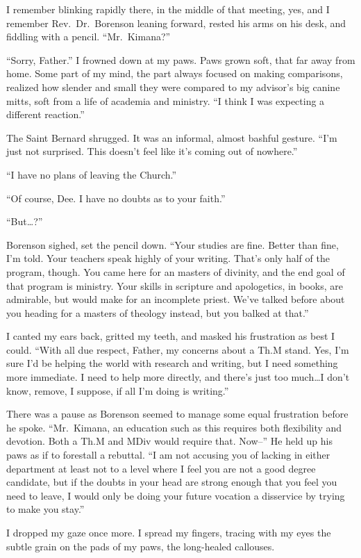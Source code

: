 I remember blinking rapidly there, in the middle of that meeting, yes, and I remember Rev.~Dr.~Borenson leaning forward, rested his arms on his desk, and fiddling with a pencil. ``Mr.~Kimana?''

``Sorry, Father.'' I frowned down at my paws. Paws grown soft, that far away from home. Some part of my mind, the part always focused on making comparisons, realized how slender and small they were compared to my advisor's big canine mitts, soft from a life of academia and ministry. ``I think I was expecting a different reaction.''

The Saint Bernard shrugged. It was an informal, almost bashful gesture. ``I'm just not surprised. This doesn't feel like it's coming out of nowhere.''

``I have no plans of leaving the Church.''

``Of course, Dee. I have no doubts as to your faith.''

``But\ldots?''

Borenson sighed, set the pencil down. ``Your studies are fine. Better than fine, I'm told. Your teachers speak highly of your writing. That's only half of the program, though. You came here for an masters of divinity, and the end goal of that program is ministry. Your skills in scripture and apologetics, in books, are admirable, but would make for an incomplete priest. We've talked before about you heading for a masters of theology instead, but you balked at that.''

I canted my ears back, gritted my teeth, and masked his frustration as best I could. ``With all due respect, Father, my concerns about a Th.M stand. Yes, I'm sure I'd be helping the world with research and writing, but I need something more immediate. I need to help more directly, and there's just too much\ldots I don't know, remove, I suppose, if all I'm doing is writing.''

There was a pause as Borenson seemed to manage some equal frustration before he spoke. ``Mr.~Kimana, an education such as this requires both flexibility and devotion. Both a Th.M and MDiv would require that. Now--'' He held up his paws as if to forestall a rebuttal. ``I am not accusing you of lacking in either department at least not to a level where I feel you are not a good degree candidate, but if the doubts in your head are strong enough that you feel you need to leave, I would only be doing your future vocation a disservice by trying to make you stay.''

I dropped my gaze once more. I spread my fingers, tracing with my eyes the subtle grain on the pads of my paws, the long-healed callouses.


